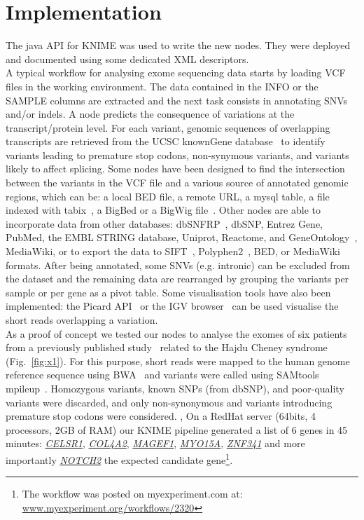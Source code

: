 \documentclass{bioinfo}
\begin{document}
\section{Implementation}

The java API for KNIME was used to write the new nodes. They were deployed and documented using some dedicated XML descriptors.
\\
A typical workflow for analysing exome sequencing data starts by loading VCF files in the working environment. The data contained in the INFO or the SAMPLE columns are extracted and the next task consists in annotating SNVs and/or indels. A node predicts the consequence of variations at the transcript/protein level. For each variant, genomic sequences of overlapping transcripts are retrieved from the UCSC knownGene database~\citep{pmid16500937} to identify variants leading to premature stop codons, non-synymous variants, and variants likely to affect splicing.  Some nodes have been designed to find the intersection between the variants in the VCF file and a various source of annotated genomic regions, which can be: a local BED file, a remote URL, a mysql table, a file indexed with tabix~\citep{pmid21208982}, a BigBed or a BigWig file~\citep{pmid20639541}. Other nodes are able to incorporate data from other databases: dbSNFRP~\citep{pmid21520341}, dbSNP, Entrez Gene, PubMed, the EMBL STRING database, Uniprot, Reactome, and GeneOntology~\citep{pmid17098935}, MediaWiki, or to export the data to SIFT~\citep{pmid11337480}, Polyphen2~\citep{pmid20354512}, BED, or MediaWiki formats. After being annotated, some SNVs (e.g. intronic) can be excluded from the dataset and the remaining data are rearranged by grouping the variants per sample or per gene as a pivot table. Some visualisation tools have also been implemented: the Picard API~\citep{pmid19505943} or the IGV browser~\citep{pmid21221095} can be used visualise the short reads overlapping a variation.
\\
As a proof of concept we tested our nodes to analyse the exomes of six patients from a previously published study~\citep{pmid21378989} related to the Hajdu Cheney syndrome (Fig.~\ref{fig:x1}). For this purpose, short reads were mapped to the human genome reference sequence using BWA~\citep{pmid20080505} and variants were called using SAMtools mpileup~\citep{pmid19505943}. Homozygous variants, known SNPs (from dbSNP), and poor-quality variants were discarded, and only non-synonymous and variants introducing premature stop codons were considered. , On a RedHat server (64bits, 4 processors, 2GB of RAM) our KNIME pipeline generated a list of 6 genes in 45 minutes: \href{http://www.ncbi.nlm.nih.gov/gene/9620}{\textit{CELSR1}},  \href{http://www.ncbi.nlm.nih.gov/gene/1284}{\textit{COL4A2}}, \href{http://www.ncbi.nlm.nih.gov/gene/64110}{\textit{MAGEF1}}, \href{http://www.ncbi.nlm.nih.gov/gene/51168}{\textit{MYO15A}}, \href{http://www.ncbi.nlm.nih.gov/gene/84905}{\textit{ZNF341}} and more importantly \href{http://www.ncbi.nlm.nih.gov/gene/4853}{\textit{NOTCH2}} the expected candidate gene\footnote{The workflow was posted on myexperiment.com at: \href{http://www.myexperiment.org/workflows/2320.html}{www.myexperiment.org/workflows/2320}}.
\end{document}
